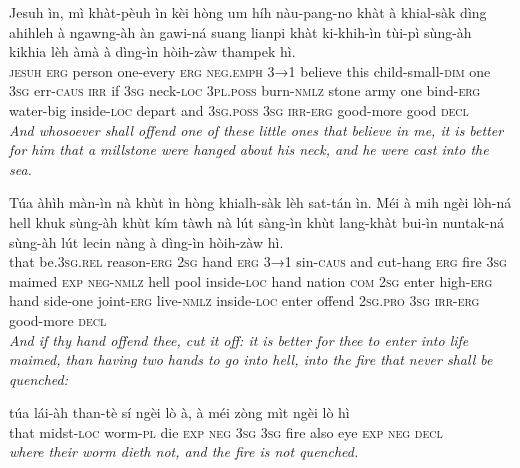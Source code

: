 \documentclass[11pt,a4paper]{article}
\begin{document}
\begin{exe}
\gll Jesuh ìn, mì khàt-pèuh ìn kèi hòng um híh nàu-pang-no khàt à khial-sàk dìng ahihleh à ngawng-àh àn gawi-ná suang lianpi khàt ki-khih-ìn tùi-pì sùng-àh kikhia lèh àmà à dìng-ìn hòih-zàw thampek hì. \\
     \textsc{jesuh} \textsc{erg} person one-every \textsc{erg} \textsc{neg}.\textsc{emph} \textsc{3→1} believe this child-small-\textsc{dim} one \textsc{3sg} err-\textsc{caus} \textsc{irr} if \textsc{3sg} neck-\textsc{loc} \textsc{3pl}.\textsc{poss} burn-\textsc{nmlz} stone army one bind-\textsc{erg} water-big inside-\textsc{loc} depart and \textsc{3sg}.\textsc{poss} \textsc{3sg} \textsc{irr}-\textsc{erg} good-more good \textsc{decl} \\
\glt \textcolor{kjvcolor}{\textit{And whosoever shall offend one of these little ones that believe in me, it is better for him that a millstone were hanged about his neck, and he were cast into the sea.}}

\gll Túa àhìh màn-ìn nà khùt ìn hòng khialh-sàk lèh sat-tán ìn. Méi à mih ngèi lòh-ná hell khuk sùng-àh khùt kím tàwh nà lút sàng-ìn khùt lang-khàt bui-ìn nuntak-ná sùng-àh lút lecin nàng à dìng-ìn hòih-zàw hì. \\
     that be.\textsc{3sg}.\textsc{rel} reason-\textsc{erg} \textsc{2sg} hand \textsc{erg} \textsc{3→1} sin-\textsc{caus} and cut-hang \textsc{erg} fire \textsc{3sg} maimed \textsc{exp} \textsc{neg}-\textsc{nmlz} hell pool inside-\textsc{loc} hand nation \textsc{com} \textsc{2sg} enter high-\textsc{erg} hand side-one joint-\textsc{erg} live-\textsc{nmlz} inside-\textsc{loc} enter offend \textsc{2sg}.\textsc{pro} \textsc{3sg} \textsc{irr}-\textsc{erg} good-more \textsc{decl} \\
\glt \textcolor{kjvcolor}{\textit{And if thy hand offend thee, cut it off: it is better for thee to enter into life maimed, than having two hands to go into hell, into the fire that never shall be quenched:}}

\gll túa lái-àh than-tè sí ngèi lò à, à méi zòng mìt ngèi lò hì \\
     that midst-\textsc{loc} worm-\textsc{pl} die \textsc{exp} \textsc{neg} \textsc{3sg} \textsc{3sg} fire also eye \textsc{exp} \textsc{neg} \textsc{decl} \\
\glt \textcolor{kjvcolor}{\textit{where their worm dieth not, and the fire is not quenched.}}


\end{exe}
\end{document}
